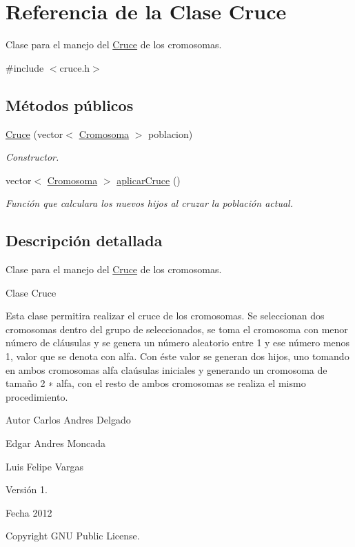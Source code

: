 \hypertarget{classCruce}{\section{Referencia de la Clase Cruce}
\label{classCruce}
}


Clase para el manejo del \hyperlink{classCruce}{Cruce} de los cromosomas.  




{\ttfamily \#include $<$cruce.\-h$>$}

\subsection*{Métodos públicos}
\begin{DoxyCompactItemize}
\item 
\hyperlink{classCruce_aed65682d35805efe97e0d72d72f9e656}{Cruce} (vector$<$ \hyperlink{classCromosoma}{Cromosoma} $>$ poblacion)
\begin{DoxyCompactList}\small\item\em Constructor. \end{DoxyCompactList}\item 
vector$<$ \hyperlink{classCromosoma}{Cromosoma} $>$ \hyperlink{classCruce_aa1c30687e13accb4b5f6f54533608ea3}{aplicar\-Cruce} ()
\begin{DoxyCompactList}\small\item\em Función que calculara los nuevos hijos al cruzar la población actual. \end{DoxyCompactList}\end{DoxyCompactItemize}


\subsection{Descripción detallada}
Clase para el manejo del \hyperlink{classCruce}{Cruce} de los cromosomas. 

\begin{DoxyVerb}Clase Cruce
\end{DoxyVerb}


Esta clase permitira realizar el cruce de los cromosomas. Se seleccionan dos cromosomas dentro del grupo de seleccionados, se toma el cromosoma con menor número de cláusulas y se genera un número aleatorio entre 1 y ese número menos 1, valor que se denota con alfa. Con éste valor se generan dos hijos, uno tomando en ambos cromosomas alfa claúsulas iniciales y generando un cromosoma de tamaño 2 ∗ alfa, con el resto de ambos cromosomas se realiza el mismo procedimiento. \begin{DoxyAuthor}{Autor}
Carlos Andres Delgado 

Edgar Andres Moncada 

Luis Felipe Vargas 
\end{DoxyAuthor}
\begin{DoxyVersion}{Versión}
1. 
\end{DoxyVersion}
\begin{DoxyDate}{Fecha}
2012 
\end{DoxyDate}
\begin{DoxyCopyright}{Copyright}
G\-N\-U Public License. 
\end{DoxyCopyright}


